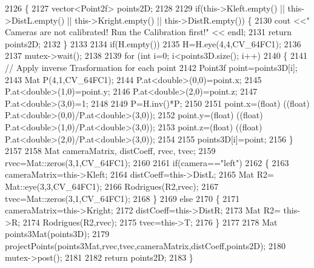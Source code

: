 \begin{DoxyCode}
2126 \{
2127     vector<Point2f> points2D;
2128 
2129     \textcolor{keywordflow}{if}(this->Kleft.empty() || this->DistL.empty() || this->Kright.empty() || this->DistR.empty()) \{
2130         cout <<\textcolor{stringliteral}{" Cameras are not calibrated! Run the Calibration first!"} << endl;
2131         \textcolor{keywordflow}{return} points2D;
2132     \}
2133 
2134     \textcolor{keywordflow}{if}(H.empty())
2135         H=H.eye(4,4,CV\_64FC1);
2136 
2137     mutex->wait();
2138 
2139     \textcolor{keywordflow}{for} (\textcolor{keywordtype}{int} i=0; i<points3D.size(); i++)
2140     \{   
2141         \textcolor{comment}{// Apply inverse Trasformation for each point}
2142         Point3f point=points3D[i];
2143         Mat P(4,1,CV\_64FC1);
2144         P.at<\textcolor{keywordtype}{double}>(0,0)=point.x;
2145         P.at<\textcolor{keywordtype}{double}>(1,0)=point.y;
2146         P.at<\textcolor{keywordtype}{double}>(2,0)=point.z;
2147         P.at<\textcolor{keywordtype}{double}>(3,0)=1;
2148 
2149         P=H.inv()*P;
2150 
2151         point.x=(float) ((\textcolor{keywordtype}{float}) P.at<\textcolor{keywordtype}{double}>(0,0)/P.at<\textcolor{keywordtype}{double}>(3,0));
2152         point.y=(float) ((\textcolor{keywordtype}{float}) P.at<\textcolor{keywordtype}{double}>(1,0)/P.at<\textcolor{keywordtype}{double}>(3,0));
2153         point.z=(float) ((\textcolor{keywordtype}{float}) P.at<\textcolor{keywordtype}{double}>(2,0)/P.at<\textcolor{keywordtype}{double}>(3,0));
2154 
2155         points3D[i]=point;
2156     \}
2157 
2158     Mat cameraMatrix, distCoeff, rvec, tvec;
2159     rvec=Mat::zeros(3,1,CV\_64FC1);
2160 
2161     \textcolor{keywordflow}{if}(camera==\textcolor{stringliteral}{"left"})
2162     \{
2163         cameraMatrix=this->Kleft;
2164         distCoeff=this->DistL;
2165         Mat R2= Mat::eye(3,3,CV\_64FC1);
2166         Rodrigues(R2,rvec);
2167         tvec=Mat::zeros(3,1,CV\_64FC1);
2168     \}
2169     \textcolor{keywordflow}{else}
2170     \{
2171         cameraMatrix=this->Kright;
2172         distCoeff=this->DistR;
2173         Mat R2= this->R;
2174         Rodrigues(R2,rvec);
2175         tvec=this->T;
2176     \}
2177 
2178     Mat points3Mat(points3D);
2179     projectPoints(points3Mat,rvec,tvec,cameraMatrix,distCoeff,points2D);
2180     mutex->post();
2181 
2182     \textcolor{keywordflow}{return} points2D;
2183 \}
\end{DoxyCode}
